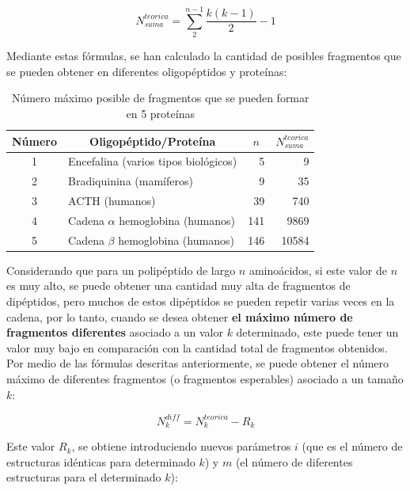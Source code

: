 \begin{equation}
N_{suma}^{teorica}=\sum_{2}^{n-1} \frac{k(k-1)}{2}-1
\end{equation}

Mediante estas fórmulas, se han calculado la cantidad de posibles fragmentos que se pueden obtener en diferentes oligopéptidos y proteínas:

\begin{table}[H]
\centering
\label{my-label3}
\begin{tabular}{|c|l|r|r|}
\hline
Número & \multicolumn{1}{c|}{Oligopéptido/Proteína} & \multicolumn{1}{c|}{$n$} & \multicolumn{1}{c|}{$N_{suma}^{teorica}$} \\ \hline
1      & Encefalina (varios tipos biológicos)       & 5                        & 9                     \\
2      & Bradiquinina (mamíferos)                   & 9                        & 35                    \\
3      & ACTH (humanos)                             & 39                       & 740                   \\
4      & Cadena $\alpha$ hemoglobina (humanos)          & 141                      & 9869                  \\
5      & Cadena $\beta$ hemoglobina (humanos)          & 146                      & 10584                 \\ \hline
\end{tabular}
\caption{Número máximo posible de fragmentos que se pueden formar en 5 proteínas}
\end{table}

Considerando que para un polipéptido de largo $n$ aminoácidos, si este valor de $n$ es muy alto, se puede obtener una cantidad muy alta de fragmentos de dipéptidos, pero muchos de estos dipéptidos se pueden repetir varias veces en la cadena, por lo tanto, cuando se desea obtener {\bf{el máximo número de fragmentos diferentes}} asociado a un valor $k$ determinado, este puede tener un valor muy bajo en comparación con la cantidad total de fragmentos obtenidos. Por medio de las fórmulas descritas anteriormente, se puede obtener el número máximo de diferentes fragmentos (o fragmentos esperables) asociado a un tamaño $k$:

\begin{equation}
N_{k}^{diff}=N_{k}^{teorica}- R_{k}
\end{equation}

Este valor $R_{k}$, se obtiene introduciendo nuevos parámetros $i$ (que es el número de estructuras idénticas para determinado $k$) y $m$ (el número de diferentes estructuras para el determinado $k$):

